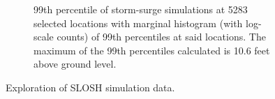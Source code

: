 \begin{figure}[t!]
\begin{subfigure}[t]{0.48\textwidth}
        \caption{99th percentile of storm-surge simulations at \num{5283} selected 
            locations with marginal histogram (with log-scale counts) of 99th 
            percentiles at said locations.  The maximum of the 99th percentiles 
            calculated is 10.6 feet above ground level.\label{fig:sloshthreshold}}
    \end{subfigure}
    \caption{Exploration of SLOSH simulation data.\label{fig:sloshexplore}}
\end{figure}



